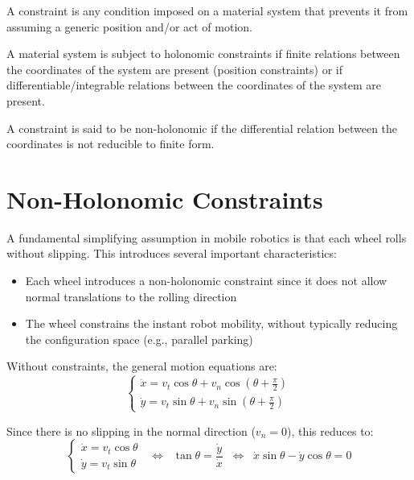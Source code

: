 \documentclass[openany]{book}
\theoremstyle{definition}
\theoremstyle{remark}
\newcommand{\definitionbox}[1]{
\begin{tcolorbox}[colback=blue!5,colframe=blue!40!black,title=Definition]
 #1
\end{tcolorbox}
}
\begin{document}
\definitionbox{A constraint is any condition imposed on a material system that prevents it from assuming a generic position and/or act of motion.}

\definitionbox{A material system is subject to holonomic constraints if finite relations between the coordinates of the system are present (position constraints) or if differentiable/integrable relations between the coordinates of the system are present.}

\definitionbox{A constraint is said to be non-holonomic if the differential relation between the coordinates is not reducible to finite form.}

\section{Non-Holonomic Constraints}

A fundamental simplifying assumption in mobile robotics is that each wheel rolls without slipping. This introduces several important characteristics:

\begin{itemize}
    \item Each wheel introduces a non-holonomic constraint since it does not allow normal translations to the rolling direction
    \item The wheel constrains the instant robot mobility, without typically reducing the configuration space (e.g., parallel parking)
\end{itemize}

Without constraints, the general motion equations are:
\begin{equation}
    \begin{cases}
        \dot{x} = v_t \cos \theta + v_n \cos(\theta + \frac{\pi}{2}) \\
        \dot{y} = v_t \sin \theta + v_n \sin(\theta + \frac{\pi}{2})
    \end{cases}
\end{equation}

Since there is no slipping in the normal direction ($v_n = 0$), this reduces to:
\begin{equation}
    \begin{cases}
        \dot{x} = v_t \cos \theta \\
        \dot{y} = v_t \sin \theta
    \end{cases}
    \;\; \Leftrightarrow \;\;
    \tan \theta = \frac{\dot{y}}{\dot{x}}
    \;\; \Leftrightarrow \;\;
    \dot{x} \sin \theta - \dot{y} \cos \theta = 0
\end{equation}
\end{document}
